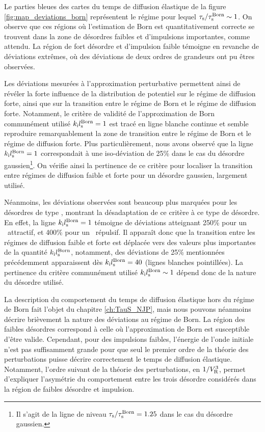 Le parties bleues des cartes du temps de diffusion élastique de la figure \ref{fig:map_deviations_born} représentent le régime pour lequel $\tau_{\mathrm{s}}/\tau_{\mathrm{s}}^{\mathrm{Born}}\sim 1$. On observe que ces régions où l'estimation de Born est quantitativement correcte se trouvent dans la zone de désordres faibles et d'impulsions importantes, comme attendu. La région de fort désordre et d'impulsion faible témoigne en revanche de déviations extrêmes, où des déviations de deux ordres de grandeurs ont pu êtres observées.

Les déviations mesurées à l'approximation perturbative permettent ainsi de révéler la forte influence de la distribution de potentiel sur le régime de diffusion forte, ainsi que sur la transition entre le régime de Born et le régime de diffusion forte. Notamment, le critère de validité de l'approximation de Born communément utilisé $k_{\mathrm{i}}l_{\mathrm{s}}^{\mathrm{Born}}=1$ est tracé en ligne blanche continue et semble reproduire remarquablement la zone de transition entre le régime de Born et le régime de diffusion forte. Plus particulièrement, nous avons observé que la ligne $k_{\mathrm{i}}l_{\mathrm{s}}^{\mathrm{Born}}=1$ correspondait à une iso-déviation de 25\% dans le cas du désordre gaussien\footnote{Il s'agit de la ligne de niveau $\tau_{\mathrm{s}}/\tau_{\mathrm{s}}^{\mathrm{Born}}=1.25$ dans le cas du désordre gaussien.}. On vérifie ainsi la pertinence de ce critère pour localiser la transition entre régimes de diffusion faible et forte pour un désordre gaussien, largement utilisé.

Néanmoins, les déviations observées sont beaucoup plus marquées pour les désordres de type \speckle , montrant la désadaptation de ce critère à ce type de désordre. En effet, la ligne $k_{\mathrm{i}}l_{\mathrm{s}}^{\mathrm{Born}}=1$ témoigne de déviations atteignant 250\% pour un \speckle\ attractif, et 400\% pour un \speckle\ répulsif. Il apparaît donc que la transition entre les régimes de diffusion faible et forte est déplacée vers des valeurs plus importantes de la quantité $k_{\mathrm{i}} l_{\mathrm{s}}^{\mathrm{Born}}$, notamment, des déviations de 25\% mentionnées précédemment apparaissent dès $k_{\mathrm{i}} l_{\mathrm{s}}^{\mathrm{Born}}=40$ (lignes blanches pointillées). La pertinence du critère communément utilisé $k_{\mathrm{i}} l_{\mathrm{s}}^{\mathrm{Born}}\sim 1$ dépend donc de la nature du désordre utilisé.

La description du comportement du temps de diffusion élastique hors du régime de Born fait l'objet du chapitre \ref{ch:TauS_NJP}, mais nous pouvons néanmoins décrire brièvement la nature des déviations au régime de Born. La région des faibles désordres correspond à celle où l'approximation de Born est susceptible d'être valide. Cependant, pour des impulsions faibles, l'énergie de l'onde initiale n'est pas suffisamment grande pour que seul le premier ordre de la théorie des perturbations puisse décrire correctement le temps de diffusion élastique. Notamment, l'ordre suivant de la théorie des perturbations, en $1/V_{\mathrm{R}}^3$, permet d'expliquer l'asymétrie du comportement entre les trois désordre considérés dans la région de faibles désordre et impulsion.

